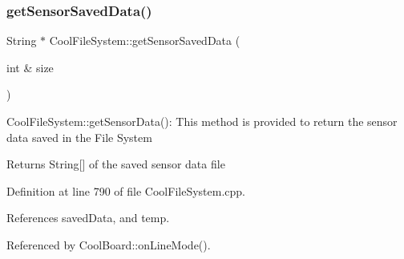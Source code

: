 \subsubsection{\texorpdfstring{get\+Sensor\+Saved\+Data()}{getSensorSavedData()}}
{\footnotesize\ttfamily String $\ast$ Cool\+File\+System\+::get\+Sensor\+Saved\+Data (\begin{DoxyParamCaption}\item[{int \&}]{size }\end{DoxyParamCaption})}

Cool\+File\+System\+::get\+Sensor\+Data()\+: This method is provided to return the sensor data saved in the File System

\begin{DoxyReturn}{Returns}
String\mbox{[}\mbox{]} of the saved sensor data file 
\end{DoxyReturn}


Definition at line 790 of file Cool\+File\+System.\+cpp.



References saved\+Data, and temp.



Referenced by Cool\+Board\+::on\+Line\+Mode().


